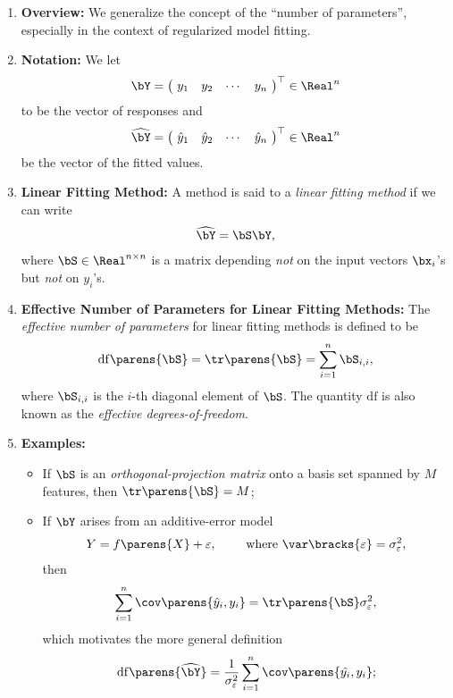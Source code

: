 \documentclass[12pt]{article}
\begin{document}
\begin{enumerate}[label=\textbf{\arabic*.}]

	\item \textbf{Overview:} We generalize the concept of the ``number of parameters'', especially in the context of regularized model fitting. 
	
	\item \textbf{Notation:} We let 
	\begin{align*}
		\bY = 
		\begin{pmatrix} 
			\  y_1 & y_2 & \cdots & y_n \  
		\end{pmatrix}^\top \in \Real^n 
	\end{align*}
	to be the vector of responses and 
	\begin{align*}
		\widehat{\bY} = 
		\begin{pmatrix} 
			\  \hat{y}_1 & \hat{y}_2 & \cdots & \hat{y}_n \ 
		\end{pmatrix}^\top \in \Real^n
	\end{align*}
	be the vector of the fitted values. 
	
	\item \textbf{Linear Fitting Method:} A method is said to a \emph{linear fitting method} if we can write 
	\begin{align*}
		\widehat{\bY} = \bS \bY, 
	\end{align*}
	where $\bS \in \Real^{n \times n}$ is a matrix depending \emph{not} on the input vectors $\bx_i$'s but \emph{not} on $y_i$'s. 
	
	\item \textbf{Effective Number of Parameters for Linear Fitting Methods:} The \textit{effective number of parameters} for linear fitting methods is defined to be 
	\begin{align*}
		\mathrm{df} \parens{\bS} = \tr \parens{\bS} = \sum_{i=1}^n \bS_{i,i}, 
	\end{align*}
	where $\bS_{i,i}$ is the $i$-th diagonal element of $\bS$. The quantity $\mathrm{df}$ is also known as the \textit{effective degrees-of-freedom}. 
	
	\item \textbf{Examples:} 
	\begin{itemize}
		\item If $\bS$ is an \emph{orthogonal-projection matrix} onto a basis set spanned by $M$ features, then $ \tr \parens{\bS} = M $; 
		\item If $\bY$ arises from an additive-error model 
		\begin{align*}
			Y = f \parens{X} + \varepsilon, \qquad \text{ where } \var \bracks{\varepsilon} = \sigma_{\varepsilon}^2, 
		\end{align*}
		then 
		\begin{align*}
			\sum_{i=1}^n \cov \parens{\hat{y}_i, y_i} = \tr \parens{\bS} \sigma_{\varepsilon}^2, 
		\end{align*}
		which motivates the more general definition 
		\begin{align*}
			\mathrm{df} \parens{\widehat{\bY}} = \frac{1}{\sigma_{\varepsilon}^2} \sum_{i=1}^n \cov \parens{\hat{y_i}, y_i}; 
		\end{align*}
		

\end{itemize}
\end{enumerate}
\end{document}

